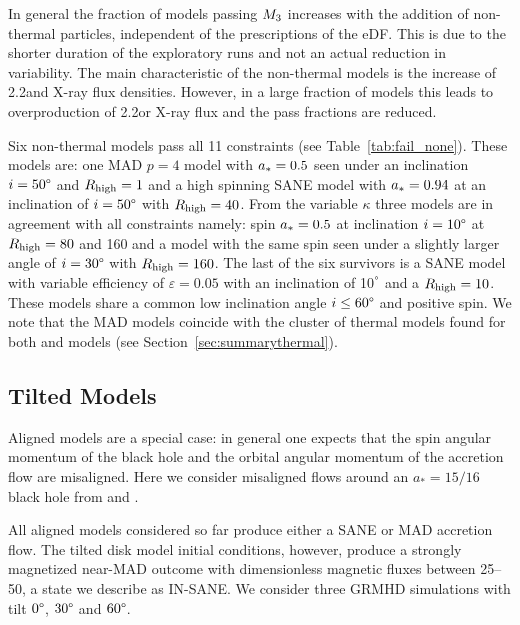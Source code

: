 In general the fraction of models passing $M_{3}$ increases with the addition of non-thermal particles, independent of the prescriptions of the eDF.  This is due to the shorter duration of the exploratory runs and not an actual reduction in variability.   The main characteristic of the non-thermal models is the increase of 2.2\um and X-ray flux densities. However, in a large fraction of models this leads to overproduction of 2.2\um or X-ray flux and the pass fractions are reduced.



Six non-thermal models pass all 11 constraints (see Table~\ref{tab:fail_none}).
These models are:
one \hamr MAD $p=4$ model with $a_*=0.5$ seen under an inclination $i=50\degree$ and
$R_\mathrm{high}=1$ and a high spinning SANE model with $a_*=0.94$ at an inclination of $i=50\degree$ with $R_\mathrm{high}=40$.
From the \bhac variable $\kappa$ three models are in agreement with all constraints namely: spin $a_*=0.5$ at inclination $i=10\degree$ at $R_\mathrm{high}=80$ and 160 and a model with the same spin seen under a slightly larger angle of $i=30\degree$ with $R_\mathrm{high}=160$.
The last of the six survivors is a \bhac SANE model with variable efficiency of $\varepsilon=0.05$ with an inclination of 10$^\degree$ and a $R_\mathrm{high}=10$.
These models share a common low inclination angle $i \leq 60\degree$ and positive spin.
We note that the MAD models coincide with the cluster of thermal models found for both \bhac and \kharma models (see Section~\ref{sec:summarythermal}).



\subsection{Tilted Models}

Aligned models are a special case: in general one expects that the spin angular momentum of the black hole and the orbital angular momentum of the accretion flow are misaligned.
Here we consider misaligned flows around an $a_*=15/16$ black hole from \citet{Liska2018} and \citet{Chatterjee2020}.

All aligned models considered so far produce either a SANE or MAD accretion flow.
The tilted disk model initial conditions, however, produce a strongly magnetized near-MAD outcome with dimensionless magnetic fluxes between 25--50, a state we describe as  IN-SANE.
We consider three GRMHD simulations with tilt $0\degree$, $30\degree$ and $60\degree$.

